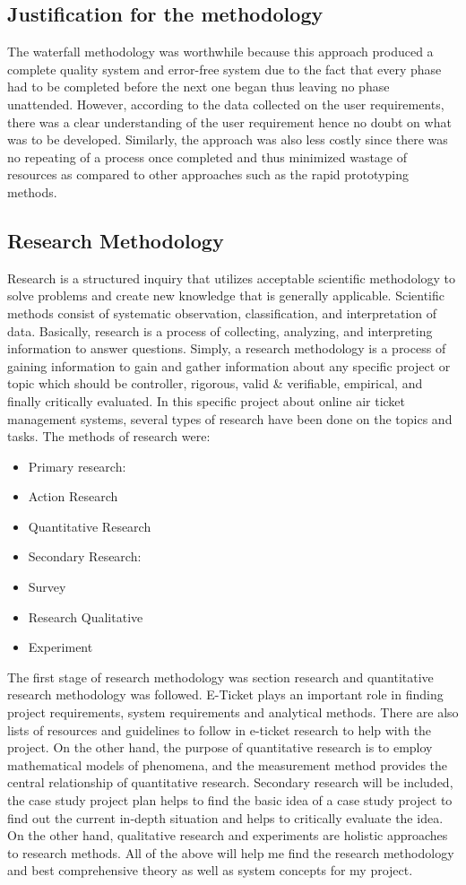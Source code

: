 \documentclass{article}
\begin{document}
\subsection{Justification for the methodology}
The waterfall methodology was worthwhile because this approach produced a complete quality system and error-free system due to the fact that every phase had to be completed before the next one began thus leaving no phase unattended. However, according to the data collected on the user requirements, there was a clear understanding of the user requirement hence no doubt on what was to be developed. Similarly, the approach was also less costly since there was no repeating of a process once completed and thus minimized wastage of resources as compared to other approaches such as the rapid prototyping methods.
\subsection{Research Methodology}
Research is a structured inquiry that utilizes acceptable scientific methodology to solve problems and create new knowledge that is generally applicable. Scientific methods consist of systematic observation, classification, and interpretation of data. Basically, research is a process of collecting, analyzing, and interpreting information to answer questions. Simply, a research methodology is a process of gaining information to gain and gather information about any specific project or topic which should be controller, rigorous, valid & verifiable, empirical, and finally critically evaluated. In this specific project about online air ticket management systems, several types of research have been done on the topics and tasks. The methods of research were:
\begin{itemize}
    \item 	Primary research:
\item Action Research
\item Quantitative Research
\item Secondary Research:
\item Survey
\item Research Qualitative
\item Experiment
\end{itemize}

The first stage of research methodology was section research and quantitative research methodology was followed. E-Ticket plays an important role in finding project requirements, system requirements and analytical methods. There are also lists of resources and guidelines to follow in e-ticket research to help with the project. On the other hand, the purpose of quantitative research is to employ mathematical models of phenomena, and the measurement method provides the central relationship of quantitative research.
Secondary research will be included, the case study project plan helps to find the basic idea of a case study project to find out the current in-depth situation and helps to critically evaluate the idea. On the other hand, qualitative research and experiments are holistic approaches to research methods. All of the above will help me find the research methodology and best comprehensive theory as well as system concepts for my project.
\newpage
\end{document}
